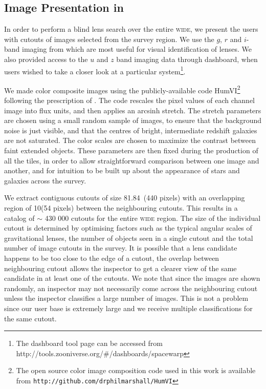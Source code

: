 \documentclass[useAMS,usenatbib,a4paper]{mn2e}
\begin{document}
\subsection{Image Presentation in \sw}
\label{sec:data:impres}

In order to perform a blind lens search over the entire \cfhtls \textsc{wide},
we present the users with cutouts of images selected from the survey region. We
use the $g$, $r$ and $i$-band imaging from \cfhtls which are most useful for visual
identification of lenses. We also provided access to the $u$ and $z$ band imaging
data through dashboard, when users wished to take a closer look at a particular system\footnote{The dashboard tool page can be accessed from
http://tools.zooniverse.org/\#/dashboards/spacewarp}.

We made color composite images using the publicly-available
code HumVI\footnote{The open source  color image composition code used in this
work is available from \texttt{http://github.com/drphilmarshall/HumVI}}
following the prescription of \citet{Lupton2004}. The code
rescales the pixel values of each channel image into flux units, and
then applies an arcsinh stretch. The stretch parameters are chosen
using a small random sample of images, to ensure that the background
noise is just visible, and that the centres of bright, intermediate
redshift galaxies are not saturated. The color scales are chosen to
maximize the contrast between faint extended objects. These parameters
are then fixed during the production of all the tiles, in order to
allow straightforward comparison between one image and another, and for
intuition to be built up about the appearance of stars and galaxies
across the survey.

We extract contiguous cutouts of size 81.84\arcsec\ (440 pixels) with an
overlapping region of 10\arcsec (54 pixels) between the neighbouring
cutouts. This  results in a catalog of $\sim$ 430 000 cutouts for the entire \cfhtls
\textsc{wide} region. The size of the individual cutout is determined by
optimising factors such as the typical angular scales of gravitational
lenses, the number of objects seen in a single cutout and the total
number of image cutouts in the survey. It is possible that a lens
candidate happens to be too close to the edge of a cutout, the overlap
between neighbouring cutout allows the inspector to get a clearer view
of the same candidate in at least one of the cutouts. We note that since
the images are shown randomly, an inspector may not necessarily come
across the neighbouring cutout unless the inspector classifies a large
number of images. This is not a problem since our user base is extremely
large and we receive multiple classifications for the same cutout.
\end{document}
